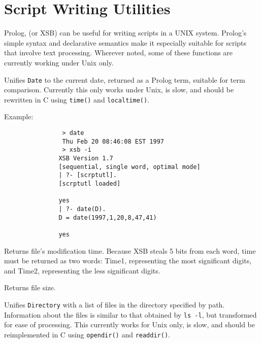 \section{Script Writing Utilities}

Prolog, (or XSB) can be useful for writing scripts in a UNIX system.
Prolog's simple syntax and declarative semantics make it especially
suitable for scripts that involve text processing.  Wherever noted, some of
these functions are currently working under Unix only.

\begin{description}

Unifies {\tt Date} to the current date, returned as a Prolog term, suitable
for term comparison.  Currently this only works under Unix, is slow, and
should be rewritten in C using {\tt time()} and {\tt localtime()}.

Example:
{\footnotesize
\begin{verbatim}
                > date 
                Thu Feb 20 08:46:08 EST 1997
                > xsb -i
               XSB Version 1.7
               [sequential, single word, optimal mode]
               | ?- [scrptutl].
               [scrptutl loaded]

               yes
               | ?- date(D).
               D = date(1997,1,20,8,47,41)

               yes
\end{verbatim}}


Returns file's modification time. Because 
XSB steals 5 bits from each word, time must be returned as two words:
Time1, representing the most significant digits, and Time2, representing
the less significant digits.


Returns file size.


Unifies {\tt Directory} with a list of files in the directory specified by
path.  Information about the files is similar to that obtained by {\tt ls
  -l}, but transformed for ease of processing.  This currently works for
Unix only, is slow, and should be reimplemented in C using {\tt opendir()}
and {\tt readdir()}.



\end{description}
